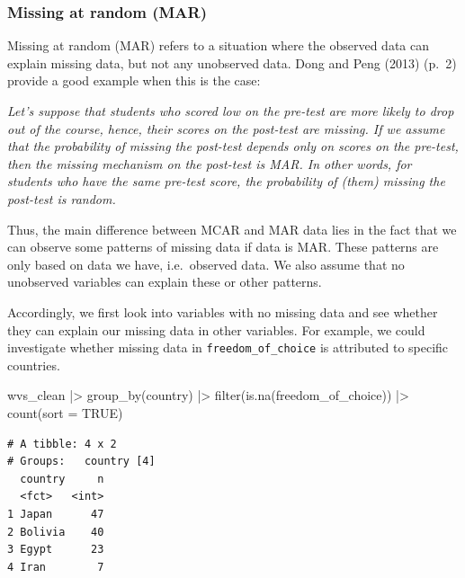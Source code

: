 \documentclass[
  letterpaper,
]{krantz}
\makeatletter
\newenvironment{Shaded}{\begin{snugshade}}{\end{snugshade}}
\newcommand{\AttributeTok}[1]{\textcolor[rgb]{0.40,0.45,0.13}{#1}}
\newcommand{\ConstantTok}[1]{\textcolor[rgb]{0.56,0.35,0.01}{#1}}
\newcommand{\FunctionTok}[1]{\textcolor[rgb]{0.28,0.35,0.67}{#1}}
\newcommand{\NormalTok}[1]{\textcolor[rgb]{0.00,0.23,0.31}{#1}}
\newcommand{\SpecialCharTok}[1]{\textcolor[rgb]{0.37,0.37,0.37}{#1}}
\renewenvironment{quote}{\begin{VF}}{\end{VF}}
\newenvironment{kframe}{%
\medskip{}
\setlength{\fboxsep}{.8em}
 \def\at@end@of@kframe{}%
 \ifinner\ifhmode%
  \def\at@end@of@kframe{\end{minipage}}%
  \begin{minipage}{\columnwidth}%
 \fi\fi%
 \def\FrameCommand##1{\hskip\@totalleftmargin \hskip-\fboxsep
 \colorbox{shadecolor}{##1}\hskip-\fboxsep
     \hskip-\linewidth \hskip-\@totalleftmargin \hskip\columnwidth}%
 \MakeFramed {\advance\hsize-\width
   \@totalleftmargin\z@ \linewidth\hsize
   \@setminipage}}%
 {\par\unskip\endMakeFramed%
 \at@end@of@kframe}
\renewenvironment{Shaded}{\begin{kframe}}{\end{kframe}}
\makeatother
\begin{document}
\subsubsection{Missing at random (MAR)}\label{sec-missing-at-random-mar}

Missing at random (MAR) refers to a situation where the observed data
can explain missing data, but not any unobserved data. Dong and Peng
(2013) (p.~2) provide a good example when this is the case:

\begin{quote}
\emph{Let's suppose that students who scored low on the pre-test are
more likely to drop out of the course, hence, their scores on the
post-test are missing. If we assume that the probability of missing the
post-test depends only on scores on the pre-test, then the missing
mechanism on the post-test is MAR. In other words, for students who have
the same pre-test score, the probability of (them) missing the post-test
is random.}
\end{quote}

Thus, the main difference between MCAR and MAR data lies in the fact
that we can observe some patterns of missing data if data is MAR. These
patterns are only based on data we have, i.e.~observed data. We also
assume that no unobserved variables can explain these or other patterns.

Accordingly, we first look into variables with no missing data and see
whether they can explain our missing data in other variables. For
example, we could investigate whether missing data in
\texttt{freedom\_of\_choice} is attributed to specific countries.

\begin{Shaded}
\begin{Highlighting}[]
\NormalTok{wvs\_clean }\SpecialCharTok{|\textgreater{}}
  \FunctionTok{group\_by}\NormalTok{(country) }\SpecialCharTok{|\textgreater{}}
  \FunctionTok{filter}\NormalTok{(}\FunctionTok{is.na}\NormalTok{(freedom\_of\_choice)) }\SpecialCharTok{|\textgreater{}}
  \FunctionTok{count}\NormalTok{(}\AttributeTok{sort =} \ConstantTok{TRUE}\NormalTok{)}
\end{Highlighting}
\end{Shaded}

\begin{verbatim}
# A tibble: 4 x 2
# Groups:   country [4]
  country     n
  <fct>   <int>
1 Japan      47
2 Bolivia    40
3 Egypt      23
4 Iran        7
\end{verbatim}
\end{document}
